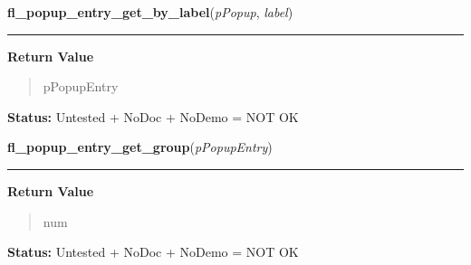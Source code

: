    \label{xformslib:flpopup:fl_popup_entry_get_by_label}

    \vspace{0.5ex}

\hspace{.8\funcindent}\begin{boxedminipage}{\funcwidth}

    \raggedright \textbf{fl\_popup\_entry\_get\_by\_label}(\textit{pPopup}, \textit{label})

    \vspace{-1.5ex}

    \rule{\textwidth}{0.5\fboxrule}
\setlength{\parskip}{2ex}
\setlength{\parskip}{1ex}
      \textbf{Return Value}
    \vspace{-1ex}

      \begin{quote}
      pPopupEntry

      \end{quote}

\textbf{Status:} Untested + NoDoc + NoDemo = NOT OK



    \end{boxedminipage}

    \label{xformslib:flpopup:fl_popup_entry_get_group}

    \vspace{0.5ex}

\hspace{.8\funcindent}\begin{boxedminipage}{\funcwidth}

    \raggedright \textbf{fl\_popup\_entry\_get\_group}(\textit{pPopupEntry})

    \vspace{-1.5ex}

    \rule{\textwidth}{0.5\fboxrule}
\setlength{\parskip}{2ex}
\setlength{\parskip}{1ex}
      \textbf{Return Value}
    \vspace{-1ex}

      \begin{quote}
      num

      \end{quote}

\textbf{Status:} Untested + NoDoc + NoDemo = NOT OK



    \end{boxedminipage}

